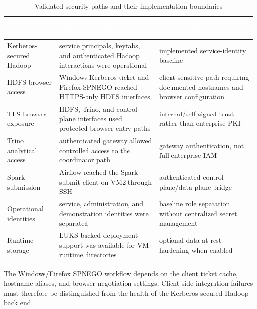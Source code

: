 \begin{table}[!htbp]
    \centering
    \footnotesize
    \renewcommand{\arraystretch}{1.14}
    \begin{tabularx}{\textwidth}{|L{0.29\textwidth}|L{0.30\textwidth}|Y|}
        \hline
        \textcolor{white}{\textbf{Security path}} & \textcolor{white}{\textbf{Validated result}} & \textcolor{white}{\textbf{Scope interpretation}} \\
        \hline
        Kerberos-secured Hadoop & service principals, keytabs, and authenticated Hadoop interactions were operational & implemented service-identity baseline \\
        \hline
        HDFS browser access & Windows Kerberos ticket and Firefox SPNEGO reached HTTPS-only HDFS interfaces & client-sensitive path requiring documented hostnames and browser configuration \\
        \hline
        TLS browser exposure & HDFS, Trino, and control-plane interfaces used protected browser entry paths & internal/self-signed trust rather than enterprise PKI \\
        \hline
        Trino analytical access & authenticated gateway allowed controlled access to the coordinator path & gateway authentication, not full enterprise IAM \\
        \hline
        Spark submission & Airflow reached the Spark submit client on VM2 through SSH & authenticated control-plane/data-plane bridge \\
        \hline
        Operational identities & service, administration, and demonstration identities were separated & baseline role separation without centralized secret management \\
        \hline
        Runtime storage & LUKS-backed deployment support was available for VM runtime directories & optional data-at-rest hardening when enabled \\
        \hline
    \end{tabularx}
    \caption{Validated security paths and their implementation boundaries}
    \label{tab:chapter8-security-validation}
\end{table}

The Windows/Firefox SPNEGO workflow depends on the client ticket cache, hostname aliases, and browser negotiation settings. Client-side integration failures must therefore be distinguished from the health of the Kerberos-secured Hadoop back end.
\FloatBarrier

